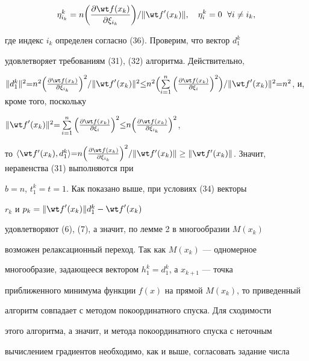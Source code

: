 $$


\eta_{i_k}^k=n\bigg({\frac{\partial\wt f(x_k)}{\partial\xi_{i_k}}}\bigg)


/\|{{\wt f}'(x_k)}\|,\quad\eta_i^k=0\ \; \forall i\neq i_k,


$$


где индекс $i_k$ определен согласно (36). Проверим, что вектор $d_1^k$


удовлетворяет требованиям (31), (32) алгоритма. Действительно,


$\|{d_1^k}\|^2{=}n^2\Big({\frac{\partial\wt f(x_k)}{


\partial\xi_{i_k}}}\Big)^2 /\|{{\wt f}'(x_k)}\|^


2{\le} n^2\Big({\sum\limits_{i=1}^{n}\Big({\frac{\partial


\wt f(x_k)}{\partial\xi_i}}\Big)^2}\Big) /\|


{{\wt f}'(x_k)}\|^2{=}n^2$, и, кроме того, поскольку


$\|{{\wt f}'(x_k)}\|^2{=}\sum\limits_{i=1}^{n}


\Big({\frac{\partial\wt f(x_k)}{\partial\xi_i}}\Big)^2


{\le} n\Big({\frac{\partial\wt f(x_k)}{\partial\xi_{i_k}}}\Big)^2$,


то $\langle \wt f'(x_k),d_1^k\rangle {=}n\Big(


\frac{\partial\wt f(x_k)}{\partial\xi_{i_k}}\Big)^2


/\|\wt f'(x_k)\|\ge\|\wt


f'(x_k)\|$. Значит, неравенства (31) выполняются при


$b=n$, $t_1^k=t=1$. Как показано выше, при условиях (34) векторы


$r_k$ и $p_k=\|{{\wt f}'(x_k)}\|d_1^k-{\wt f}'(x_k)$


удовлетворяют (6), (7), а значит, по лемме 2 в многообразии $M(x_k)$


возможен релаксационный переход. Так как $M(x_k)$ --- одномерное


многообразие, задающееся вектором $h_1^k=d_1^k$, а $x_{k+1}$ --- точка


приближенного минимума функции $f(x)$ на прямой $M(x_k)$, то приведенный


алгоритм совпадает с методом покоординатного спуска. Для сходимости


этого алгоритма, а значит, и метода покоординатного спуска с неточным


вычислением градиентов необходимо, как и выше, согласовать задание числа


